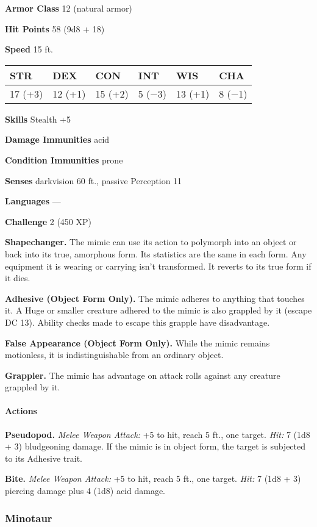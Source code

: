 \documentclass[
]{article}
\begin{document}
\textbf{Armor Class} 12 (natural armor)

\textbf{Hit Points} 58 (9d8 + 18)

\textbf{Speed} 15 ft.

\begin{longtable}[]{@{}llllll@{}}
\toprule
STR & DEX & CON & INT & WIS & CHA\tabularnewline
\midrule
\endhead
17 (+3) & 12 (+1) & 15 (+2) & 5 (−3) & 13 (+1) & 8 (−1)\tabularnewline
\bottomrule
\end{longtable}

\textbf{Skills} Stealth +5

\textbf{Damage Immunities} acid

\textbf{Condition Immunities} prone

\textbf{Senses} darkvision 60 ft., passive Perception 11

\textbf{Languages} ---

\textbf{Challenge} 2 (450 XP)

\textbf{Shapechanger.} The mimic can use its action to polymorph into an
object or back into its true, amorphous form. Its statistics are the
same in each form. Any equipment it is wearing or carrying isn't
transformed. It reverts to its true form if it dies.

\textbf{Adhesive (Object Form Only).} The mimic adheres to anything that
touches it. A Huge or smaller creature adhered to the mimic is also
grappled by it (escape DC 13). Ability checks made to escape this
grapple have disadvantage.

\textbf{False Appearance (Object Form Only).} While the mimic remains
motionless, it is indistinguishable from an ordinary object.

\textbf{Grappler.} The mimic has advantage on attack rolls against any
creature grappled by it.

\hypertarget{actions-9}{%
\paragraph{Actions}\label{actions-9}}

\textbf{Pseudopod.} \emph{Melee Weapon Attack:} +5 to hit, reach 5 ft.,
one target. \emph{Hit:} 7 (1d8 + 3) bludgeoning damage. If the mimic is
in object form, the target is subjected to its Adhesive trait.

\textbf{Bite.} \emph{Melee Weapon Attack:} +5 to hit, reach 5 ft., one
target. \emph{Hit:} 7 (1d8 + 3) piercing damage plus 4 (1d8) acid
damage.

\hypertarget{minotaur}{%
\subsubsection{Minotaur}\label{minotaur}}
\end{document}
